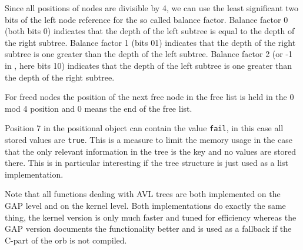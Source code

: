 \documentclass[a4paper,11pt]{report}
\begin{document}
{{ Since all positions of nodes are divisible by 4, we can use the least
significant two bits of the left node reference for the so called balance
factor. Balance factor 0 (both bits 0) indicates that the depth of the left
subtree is equal to the depth of the right subtree. Balance factor 1 (bits 01)
indicates that the depth of the right subtree is one greater than the depth of
the left subtree. Balance factor 2 (or -1 in \cite{ACP3}, here bits 10) indicates that the depth of the left subtree is one greater
than the depth of the right subtree. 

 For freed nodes the position of the next free node in the free list is held in
the 0 mod 4 position and 0 means the end of the free list. 

 Position 7 in the positional object can contain the value \texttt{fail}, in this case all stored values are \texttt{true}. This is a measure to limit the memory usage in the case that the only
relevant information in the tree is the key and no values are stored there.
This is in particular interesting if the tree structure is just used as a list
implementation. 

 Note that all functions dealing with AVL trees are both implemented on the \textsf{GAP} level and on the kernel level. Both implementations do exactly the same thing,
the kernel version is only much faster and tuned for efficiency whereas the \textsf{GAP} version documents the functionality better and is used as a fallback if the
C-part of the \textsf{orb} is not compiled. }

  }

  
\end{document}
